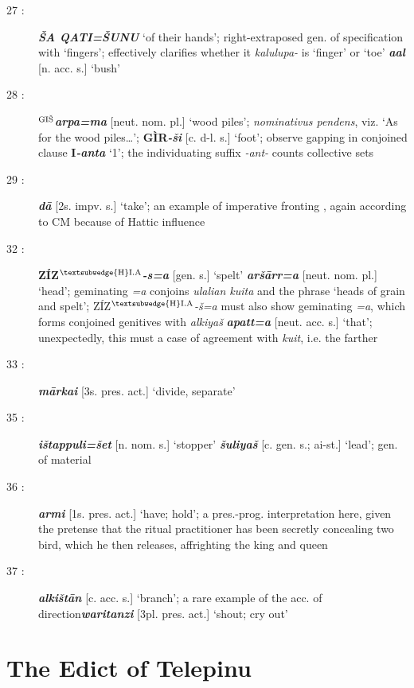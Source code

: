 \documentclass[10pt]{article}
\newcommand{\supersc}[1]{$^{\textrm{\scriptsize{#1}}}$}  	%
\newcommand{\bit}[1]{\textbf{\textit{#1}}}				%
\newcommand{\p}[1]{{\tiny[{#1}]}}					%
\newcommand{\hith}{\textsubwedge{h}}
\newcommand{\Hith}{\textsubwedge{H}}
\newcommand{\hpl}{\supersc{{\Hith}I.A}}
\newcommand{\wood}{\supersc{GI\v{S}}}
\renewcommand{\.}[1]{\textsubdot{#1}}
\begin{document}
\begin{description}
\item[27 :] \bit{\v{S}A QATI=\v{S}UNU} `of their hands'; right-extraposed gen. of specification with `fingers'; effectively clarifies whether it \textit{kalulupa-} is `finger' or `toe' \bit{{\hith}a{\hith\hith}al} \p{n. acc. s.} `bush'

\item[28 :] \textbf{{\wood}}\bit{{\hith}arpa=ma} \p{neut. nom. pl.} `wood piles'; \textit{nominativus pendens}, viz. `As for the wood piles\ldots'; \textbf{G\`IR}\bit{-\v{s}i} \p{c. d-l. s.} `foot'; observe gapping in conjoined clause \textbf{I}\bit{-anta} `1'; the individuating suffix \textit{-ant-} counts collective sets

\item[29 :] \bit{d\=a} \p{2s. impv. s.} `take'; an example of imperative fronting , again according to CM because of Hattic influence

\item[32 :] \textbf{Z\'IZ{\hpl}}\bit{-s=a} \p{gen. s.} `spelt' \bit{{\hith}ar\v{s}\=arr=a} \p{neut. nom. pl.} `head'; geminating \textit{=a} conjoins \textit{{\hith}ulalian kuita} and the phrase `heads of grain and spelt'; Z\'IZ{\hpl}\textit{-\v{s}=a} must also show geminating \textit{=a}, which forms conjoined genitives with \textit{{\hith}alkiya\v{s}} \bit{apatt=a} \p{neut. acc. s.} `that'; unexpectedly, this must a case of agreement with \textit{kuit}, i.e. the farther

\item[33 :] \bit{m\=arka{\hith\hith}i} \p{3s. pres. act.} `divide, separate'

\item[35 :] \bit{i\v{s}tappuli=\v{set}} \p{n. nom. s.} `stopper' \bit{\v{s}uliya\v{s}} \p{c. gen. s.; ai-st.} `lead'; gen. of material

\item[36 :] \bit{{\hith}armi} \p{1s. pres. act.} `have; hold'; a pres.-prog. interpretation here, given the pretense that the ritual practitioner has been secretly concealing two bird, which he then releases, affrighting the king and queen

\item[37 :] \bit{alki\v{s}t\=an} \p{c. acc. s.} `branch'; a rare example of the acc. of direction\bit{waritanzi} \p{3pl. pres. act.} `shout; cry out'

\end{description}

\section{The Edict of Telepinu}
\end{document}
